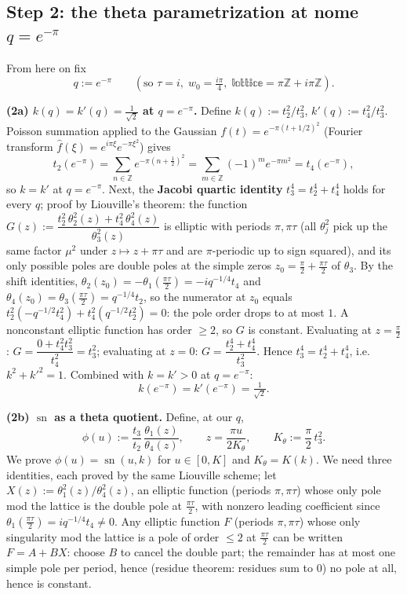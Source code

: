 \documentclass[11pt]{article}
\theoremstyle{remark}
\begin{document}
\subsection*{Step 2: the theta parametrization at nome $q=e^{-\pi}$}

From here on fix
\[q:=e^{-\pi}\qquad(\text{so }\tau=i,\; w_0=\tfrac{i\pi}{4},\; \mathbb{lattice}=\pi\mathbb Z+i\pi\mathbb Z).\]

\textbf{(2a) $k(q)=k'(q)=\tfrac1{\sqrt2}$ at $q=e^{-\pi}$.} Define $k(q):=t_2^2/t_3^2$, $k'(q):=t_4^2/t_3^2$. Poisson summation applied to the Gaussian $f(t)=e^{-\pi(t+1/2)^2}$ (Fourier transform $\hat f(\xi)=e^{i\pi\xi}e^{-\pi\xi^2}$) gives
\[t_2(e^{-\pi})=\sum_{n\in\mathbb Z}e^{-\pi(n+\frac12)^2}=\sum_{m\in\mathbb Z}(-1)^m e^{-\pi m^2}=t_4(e^{-\pi}),\]
so $k=k'$ at $q=e^{-\pi}$. Next, the \textbf{Jacobi quartic identity} $t_3^4=t_2^4+t_4^4$ holds for every $q$; proof by Liouville's theorem: the function
$G(z):=\dfrac{t_2^2\,\theta_2^2(z)+t_4^2\,\theta_4^2(z)}{\theta_3^2(z)}$
is elliptic with periods $\pi,\pi\tau$ (all $\theta_j^2$ pick up the same factor $\mu^2$ under $z\mapsto z+\pi\tau$ and are $\pi$-periodic up to sign squared), and its only possible poles are double poles at the simple zeros $z_0=\tfrac\pi2+\tfrac{\pi\tau}2$ of $\theta_3$. By the shift identities, $\theta_2(z_0)=-\theta_1(\tfrac{\pi\tau}2)=-iq^{-1/4}t_4$ and $\theta_4(z_0)=\theta_3(\tfrac{\pi\tau}2)=q^{-1/4}t_2$, so the numerator at $z_0$ equals $t_2^2(-q^{-1/2}t_4^2)+t_4^2(q^{-1/2}t_2^2)=0$: the pole order drops to at most $1$. A nonconstant elliptic function has order $\ge 2$, so $G$ is constant. Evaluating at $z=\tfrac\pi2$: $G=\dfrac{0+t_4^2t_3^2}{t_4^2}=t_3^2$; evaluating at $z=0$: $G=\dfrac{t_2^4+t_4^4}{t_3^2}$. Hence $t_3^4=t_2^4+t_4^4$, i.e. $k^2+k'^2=1$. Combined with $k=k'>0$ at $q=e^{-\pi}$:
\[k(e^{-\pi})=k'(e^{-\pi})=\tfrac1{\sqrt2}. \]

\textbf{(2b) $\operatorname{sn}$ as a theta quotient.} Define, at our $q$,
\[\phi(u):=\frac{t_3}{t_2}\,\frac{\theta_1(z)}{\theta_4(z)},\qquad z=\frac{\pi u}{2K_\theta},\qquad K_\theta:=\frac\pi2\,t_3^2 .\]
We prove $\phi(u)=\operatorname{sn}(u,k)$ for $u\in[0,K]$ and $K_\theta=K(k)$. We need three identities, each proved by the same Liouville scheme; let $X(z):=\theta_1^2(z)/\theta_4^2(z)$, an elliptic function (periods $\pi,\pi\tau$) whose only pole mod the lattice is the double pole at $\tfrac{\pi\tau}2$, with nonzero leading coefficient since $\theta_1(\tfrac{\pi\tau}2)=iq^{-1/4}t_4\ne0$. Any elliptic function $F$ (periods $\pi,\pi\tau$) whose only singularity mod the lattice is a pole of order $\le2$ at $\tfrac{\pi\tau}2$ can be written $F=A+BX$: choose $B$ to cancel the double part; the remainder has at most one simple pole per period, hence (residue theorem: residues sum to $0$) no pole at all, hence is constant.
\end{document}
